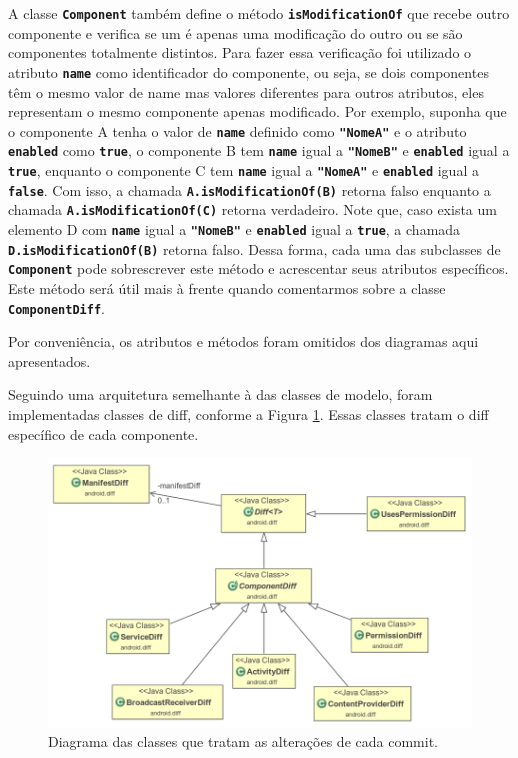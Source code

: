 \documentclass[a4paper,12pt]{article}
\begin{document}
A classe {\small\texttt{\textbf{Component}}} também define o método {\small\texttt{\textbf{isModificationOf}}} que recebe outro componente e verifica se um é apenas uma modificação do outro ou se são componentes totalmente distintos. Para fazer essa verificação foi utilizado o atributo {\small\texttt{\textbf{name}}} como identificador do componente, ou seja, se dois componentes têm o mesmo valor de name mas valores diferentes para outros atributos, eles representam o mesmo componente apenas modificado. Por exemplo, suponha que o componente A tenha o valor de {\small\texttt{\textbf{name}}} definido como {\small\texttt{\textbf{"NomeA"}}} e o atributo {\small\texttt{\textbf{enabled}}} como {\small\texttt{\textbf{true}}}, o componente B tem {\small\texttt{\textbf{name}}} igual a {\small\texttt{\textbf{"NomeB"}}} e {\small\texttt{\textbf{enabled}}} igual a {\small\texttt{\textbf{true}}}, enquanto o componente C tem {\small\texttt{\textbf{name}}} igual a {\small\texttt{\textbf{"NomeA"}}} e {\small\texttt{\textbf{enabled}}} igual a {\small\texttt{\textbf{false}}}. Com isso, a chamada {\small\texttt{\textbf{A.isModificationOf(B)}}} retorna falso enquanto a chamada {\small\texttt{\textbf{A.isModificationOf(C)}}} retorna verdadeiro. Note que, caso exista um elemento D com {\small\texttt{\textbf{name}}} igual a {\small\texttt{\textbf{"NomeB"}}} e {\small\texttt{\textbf{enabled}}} igual a {\small\texttt{\textbf{true}}}, a chamada {\small\texttt{\textbf{D.isModificationOf(B)}}} retorna falso. Dessa forma, cada uma das subclasses de {\small\texttt{\textbf{Component}}} pode sobrescrever este método e acrescentar seus atributos específicos. Este método será útil mais à frente quando comentarmos sobre a classe {\small\texttt{\textbf{ComponentDiff}}}.

Por conveniência, os atributos e métodos foram omitidos dos diagramas aqui apresentados. %


Seguindo uma arquitetura semelhante à das classes de modelo, foram implementadas classes de diff, conforme a Figura \ref{fig:diff}. Essas classes tratam o diff específico de cada componente. \\


\begin{figure}[h]
\centering
\includegraphics[width=0.8\linewidth]{imgs/diff.png}
\caption{Diagrama das classes que tratam as alterações de cada commit.}
\label{fig:diff}
\end{figure}
\end{document}
